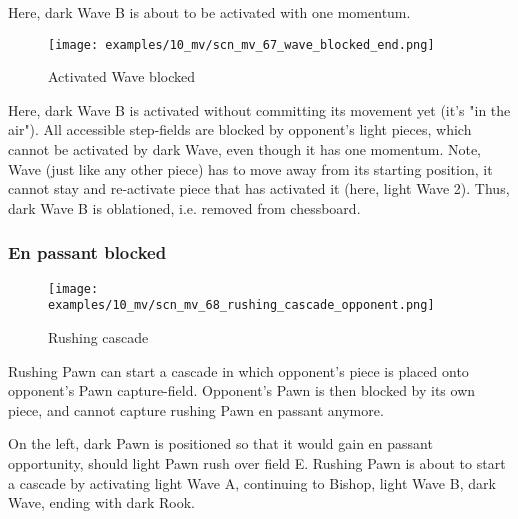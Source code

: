 Here, dark Wave B is about to be activated with one momentum.

\clearpage %

\vspace*{-2.1\baselineskip}
\noindent
\begin{figure}[h]
\texttt{[image: examples/10\_mv/scn\_mv\_67\_wave\_blocked\_end.png]}
\caption{Activated Wave blocked}
\label{fig:scn_mv_67_wave_blocked_end}
\end{figure}

Here, dark Wave B is activated without committing its movement yet (it's "in the air").
All accessible step-fields are blocked by opponent's light pieces, which cannot be
activated by dark Wave, even though it has one momentum.
Note, Wave (just like any other piece) has to move away from its starting position,
it cannot stay and re-activate piece that has activated it (here, light Wave 2).
Thus, dark Wave B is oblationed, i.e. removed from chessboard.

\clearpage %

\subsubsection*{En passant blocked}
\label{sec:Miranda's veil/Wave/Cascading opponent/En passant blocked}

\vspace*{-0.7\baselineskip}
\noindent
\begin{wrapfigure}[15]{l}{0.4\textwidth}
\centering
\texttt{[image: examples/10\_mv/scn\_mv\_68\_rushing\_cascade\_opponent.png]}
\vspace*{-1.4\baselineskip}
\caption{Rushing cascade}
\label{fig:scn_mv_68_rushing_cascade_opponent}
\end{wrapfigure}
Rushing Pawn can start a cascade in which opponent's piece is placed onto opponent's
Pawn capture-field.
Opponent's Pawn is then blocked by its own piece, and cannot capture rushing Pawn en
passant anymore.

On the left, dark Pawn is positioned so that it would gain en passant opportunity,
should light Pawn rush over field E. Rushing Pawn is about to start a cascade by
activating light Wave A, continuing to Bishop, light Wave B, dark Wave, ending
with dark Rook.

